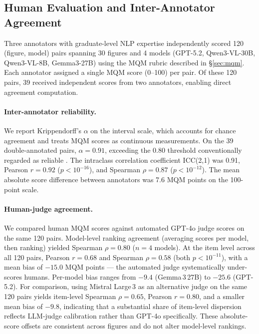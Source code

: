 \subsection{Human Evaluation and Inter-Annotator Agreement}
\label{sec:appendix-human-validation}

Three annotators with graduate-level NLP expertise independently scored 120 (figure, model) pairs spanning 30 figures and 4 models (GPT-5.2, Qwen3-VL-30B, Qwen3-VL-8B, Gemma3-27B) using the MQM rubric described in \S\ref{sec:mqm}. Each annotator assigned a single MQM score (0--100) per pair. Of these 120 pairs, 39 received independent scores from two annotators, enabling direct agreement computation.

\paragraph{Inter-annotator reliability.}
We report Krippendorff's $\alpha$ on the interval scale, which accounts for chance agreement and treats MQM scores as continuous measurements. On the 39 double-annotated pairs, $\alpha = 0.91$, exceeding the 0.80 threshold conventionally regarded as reliable \citep{krippendorff2011computing}. The intraclass correlation coefficient ICC(2,1) was 0.91, Pearson $r = 0.92$ ($p < 10^{-16}$), and Spearman $\rho = 0.87$ ($p < 10^{-12}$). The mean absolute score difference between annotators was 7.6 MQM points on the 100-point scale.

\paragraph{Human-judge agreement.}
We compared human MQM scores against automated GPT-4o judge scores on the same 120 pairs. Model-level ranking agreement (averaging scores per model, then ranking) yielded Spearman $\rho = 0.80$ ($n = 4$ models). At the item level across all 120 pairs, Pearson $r = 0.68$ and Spearman $\rho = 0.58$ (both $p < 10^{-11}$), with a mean bias of $-15.0$ MQM points --- the automated judge systematically under-scores humans. Per-model bias ranges from $-9.4$ (Gemma\,3\,27B) to $-25.6$ (GPT-5.2). For comparison, using Mistral Large\,3 as an alternative judge on the same 120 pairs yields item-level Spearman $\rho = 0.65$, Pearson $r = 0.80$, and a smaller mean bias of $-9.8$, indicating that a substantial share of item-level dispersion reflects LLM-judge calibration rather than GPT-4o specifically. These absolute-score offsets are consistent across figures and do not alter model-level rankings.


